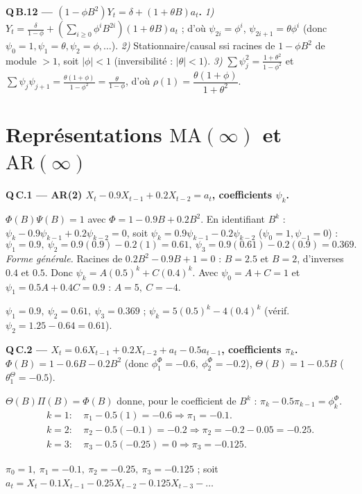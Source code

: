 \documentclass[11pt]{article}
\begin{document}
\textbf{Q\,B.12 --- $(1-\phi B^2)Y_t=\delta+(1+\theta B)a_t$.}
\emph{1)} $Y_t=\frac{\delta}{1-\phi}+(\sum_{i\ge0}\phi^iB^{2i})(1+\theta B)a_t$ ; d'où
$\psi_{2i}=\phi^i$, $\psi_{2i+1}=\theta\phi^i$ (donc $\psi_0=1,\psi_1=\theta,\psi_2=\phi,\dots$).
\emph{2)} Stationnaire/causal ssi racines de $1-\phi B^2$ de module $>1$, soit $|\phi|<1$
(inversibilité : $|\theta|<1$).
\emph{3)} $\sum\psi_j^2=\frac{1+\theta^2}{1-\phi^2}$ et
$\sum\psi_j\psi_{j+1}=\frac{\theta(1+\phi)}{1-\phi^2}=\frac{\theta}{1-\phi}$, d'où
$\rho(1)=\dfrac{\theta(1+\phi)}{1+\theta^2}$.

\section{Représentations \texorpdfstring{$\mathrm{MA}(\infty)$ et $\mathrm{AR}(\infty)$}{MA-inf et AR-inf}}

\textbf{Q\,C.1 --- AR(2) $X_t-0.9X_{t-1}+0.2X_{t-2}=a_t$, coefficients $\psi_k$.}
\begin{etapes}
$\Phi(B)\Psi(B)=1$ avec $\Phi=1-0.9B+0.2B^2$. En identifiant $B^k$ :
$\psi_k-0.9\psi_{k-1}+0.2\psi_{k-2}=0$, soit
$\psi_k=0.9\psi_{k-1}-0.2\psi_{k-2}$ ($\psi_0=1,\psi_{-1}=0$) :
\[
\psi_1=0.9,\ \psi_2=0.9(0.9)-0.2(1)=0.61,\ \psi_3=0.9(0.61)-0.2(0.9)=0.369.
\]
\emph{Forme générale.} Racines de $0.2B^2-0.9B+1=0$ : $B=2.5$ et $B=2$, d'inverses $0.4$ et
$0.5$. Donc $\psi_k=A(0.5)^k+C(0.4)^k$. Avec $\psi_0=A+C=1$ et $\psi_1=0.5A+0.4C=0.9$ :
$A=5,\ C=-4$.
\end{etapes}
\begin{reponse}$\psi_1=0.9,\ \psi_2=0.61,\ \psi_3=0.369$ ;
$\boxed{\psi_k=5(0.5)^k-4(0.4)^k}$ (vérif.\ $\psi_2=1.25-0.64=0.61$).\end{reponse}

\textbf{Q\,C.2 --- $X_t=0.6X_{t-1}+0.2X_{t-2}+a_t-0.5a_{t-1}$, coefficients $\pi_k$.}
$\Phi(B)=1-0.6B-0.2B^2$ (donc $\phi^\Phi_1=-0.6,\ \phi^\Phi_2=-0.2$), $\Theta(B)=1-0.5B$
($\theta^\Theta_1=-0.5$).
\begin{etapes}
$\Theta(B)\Pi(B)=\Phi(B)$ donne, pour le coefficient de $B^k$ : $\pi_k-0.5\pi_{k-1}=\phi^\Phi_k$.
\begin{align*}
k=1:&\ \pi_1-0.5(1)=-0.6\Rightarrow \pi_1=-0.1.\\
k=2:&\ \pi_2-0.5(-0.1)=-0.2\Rightarrow \pi_2=-0.2-0.05=-0.25.\\
k=3:&\ \pi_3-0.5(-0.25)=0\Rightarrow \pi_3=-0.125.
\end{align*}
\end{etapes}
\begin{reponse}$\pi_0=1,\ \pi_1=-0.1,\ \pi_2=-0.25,\ \pi_3=-0.125$ ; soit
$a_t=X_t-0.1X_{t-1}-0.25X_{t-2}-0.125X_{t-3}-\dots$\end{reponse}
\end{document}
